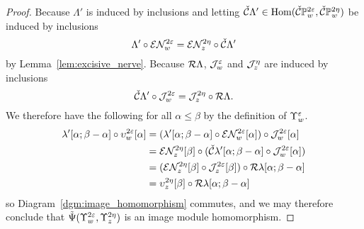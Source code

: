 \begin{proof}
  Because $\Lambda'$ is induced by inclusions and letting $\check{\mathcal{C}}\Lambda'\in\mathrm{Hom}(\check{\mathcal{C}}\mathbb{P}_{w}^{2\varepsilon},\check{\mathcal{C}}\mathbb{P}_{w}^{2\eta})$ be induced by inclusions
  \[\Lambda'\circ\mathcal{E}\mathcal{N}_w^{2\varepsilon} = \mathcal{E}\mathcal{N}_z^{2\eta}\circ \check{\mathcal{C}}\Lambda'\]
  by Lemma~\ref{lem:excisive_nerve}.
  Because $\mathcal{R}\Lambda$, $\mathcal{J}_w^\varepsilon$ and $\mathcal{J}_z^\eta$ are induced by inclusions
  \[ \check{\mathcal{C}}\Lambda'\circ \mathcal{J}_w^{2\varepsilon} = \mathcal{J}_z^{2\eta}\circ\mathcal{R}\Lambda.\]
  We therefore have the following for all $\alpha\leq\beta$ by the definition of $\Upsilon_w^\varepsilon$.
  \begin{align*}
    \lambda'[\alpha;\beta-\alpha]\circ \upsilon_w^{2\varepsilon}[\alpha] &= (\lambda'[\alpha;\beta-\alpha]\circ \mathcal{E}\mathcal{N}_w^{2\varepsilon}[\alpha])\circ \mathcal{J}_w^{2\varepsilon}[\alpha]\\
      &=\mathcal{E}\mathcal{N}_z^{2\eta}[\beta]\circ(\check{\mathcal{C}}\lambda'[\alpha;\beta-\alpha]\circ\mathcal{J}_w^{2\varepsilon}[\alpha])\\
      &=(\mathcal{E}\mathcal{N}_z^{2\eta}[\beta]\circ\mathcal{J}_z^{2\varepsilon}[\beta])\circ\mathcal{R}\lambda[\alpha;\beta-\alpha]\\
      &=\upsilon_z^{2\eta}[\beta]\circ\mathcal{R}\lambda[\alpha;\beta-\alpha]
  \end{align*}
  so Diagram~\ref{dgm:image_homomorphism} commutes, and we may therefore conclude that $\tilde{\Psi}(\Upsilon_w^{2\varepsilon},\Upsilon_z^{2\eta})$ is an image module homomorphism.
\end{proof}

